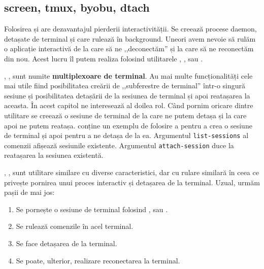 \subsection{screen, tmux, byobu, dtach}
\label{sec:process:screen-tmux}

Folosirea  și  are dezavantajul pierderii interactivității.
Se creează procese daemon, detașate de terminal și care rulează în background.
Uneori avem nevoie să rulăm o aplicație interactivă de la care să ne ,,deconectăm'' și la care să ne reconectăm din nou.
Acest lucru îl putem realiza folosind utilitarele , ,  sau .

, ,  sunt numite \textbf{multiplexoare de terminal}.
Au mai multe funcționalități cele mai utile fiind posibilitatea creării de ,,subferestre de terminal'' într-o singură sesiune și posibilitatea detașării de la sesiunea de terminal și apoi reatașarea la aceasta.
În acest capitol ne interesează al doilea rol.
Când pornim oricare dintre utilitare se creează o sesiune de terminal de la care ne putem detașa și la care apoi ne putem reatașa.
 conține un exemplu de folosire a  pentru a crea o sesiune de terminal și apoi pentru a ne detașa de la ea.
Argumentul \texttt{list-sessions} al comenzii  afișează sesiunile existente.
Argumentul \texttt{attach-session} duce la reatașarea la sesiunea existentă.


, ,  sunt utilitare similare cu diverse caracteristici, dar cu rulare similară în ceea ce privește pornirea unui proces interactiv și detașarea de la terminal.
Uzual, urmăm pașii de mai jos:

\begin{enumerate}
  \item Se pornește o sesiune de terminal folosind ,  sau .
  \item Se rulează comenzile în acel terminal.
  \item Se face detașarea de la terminal.
  \item Se poate, ulterior, realizare reconectarea la terminal.
\end{enumerate}

